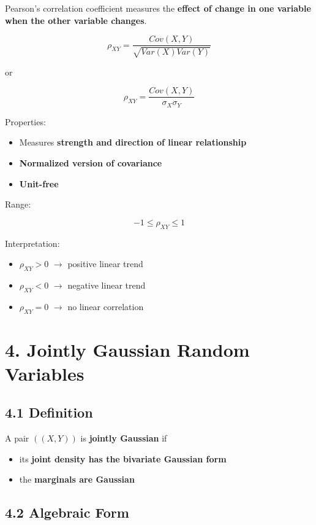 \documentclass[12pt]{article}
\begin{document}
Pearson’s correlation coefficient measures the \textbf{effect of change in one variable when the other variable changes}.

\[
\rho_{XY}=\frac{Cov(X,Y)}{\sqrt{Var(X)Var(Y)}}
\]

or

\[
\rho_{XY}=\frac{Cov(X,Y)}{\sigma_X\sigma_Y}
\]

Properties:

\begin{itemize}
\item Measures \textbf{strength and direction of linear relationship}
\item \textbf{Normalized version of covariance}
\item \textbf{Unit-free}
\end{itemize}

Range:

\[
-1 \le \rho_{XY} \le 1
\]

Interpretation:

\begin{itemize}
\item $\rho_{XY}>0$ $\rightarrow$ positive linear trend
\item $\rho_{XY}<0$ $\rightarrow$ negative linear trend
\item $\rho_{XY}=0$ $\rightarrow$ no linear correlation
\end{itemize}

\section*{4. Jointly Gaussian Random Variables}

\subsection*{4.1 Definition}

A pair $((X,Y))$ is \textbf{jointly Gaussian} if

\begin{itemize}
\item its \textbf{joint density has the bivariate Gaussian form}
\item the \textbf{marginals are Gaussian}
\end{itemize}

\subsection*{4.2 Algebraic Form}
\end{document}
